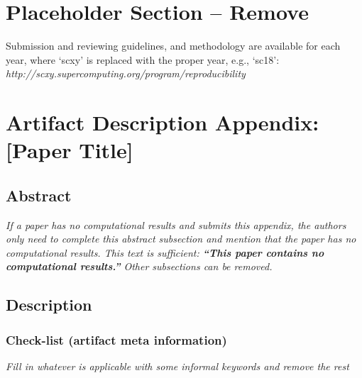 \documentclass{IEEETran}
\begin{document}

\section{Placeholder Section -- Remove}

Submission and reviewing guidelines, and methodology are available for each year, where `scxy' is replaced with the proper year, e.g., `sc18': \\
{\small\em http://scxy.supercomputing.org/program/reproducibility}


\appendix

\section{Artifact Description Appendix: [Paper Title]}


\subsection{Abstract}

{\em If a paper has no computational results and submits this appendix, the authors only need to complete this abstract subsection and mention that the paper has no computational results.  This text is sufficient: \textbf{``This paper contains no computational results.''}  Other subsections can be removed.}

\subsection{Description}

\subsubsection{Check-list (artifact meta information)}

{\em Fill in whatever is applicable with some informal keywords and remove the rest}
\end{document}
